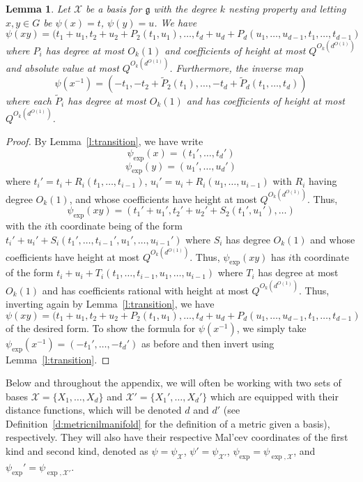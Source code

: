 \documentclass[11pt, a4paper]{amsart}
\theoremstyle{plain}
\theoremstyle{plain}
\newtheorem{lemma}{Lemma}
\theoremstyle{definition}
\theoremstyle{remark}
\numberwithin{equation}{section}
\numberwithin{lemma}{section}
\numberwithin{proposition}{section}
\numberwithin{corollary}{section}
\numberwithin{definition}{section}
\numberwithin{claim}{section}
\begin{document}
\begin{lemma}\label{l:multiplication}
Let $\mathcal{X}$ be a basis for $\mathfrak{g}$ with the degree $k$ nesting property and letting $x, y \in G$ be $\psi(x) = t$, $\psi(y) = u$. We have
$$\psi(xy) = (t_1 + u_1, t_2 + u_2 + P_2(t_1, u_1), \dots, t_d + u_d + P_d(u_1, \dots, u_{d - 1}, t_1, \dots, t_{d - 1})$$
where $P_i$ has degree at most $O_k(1)$ and coefficients of height at most $Q^{O_k(d^{O(1)})}$ and absolute value at most $Q^{O_k(d^{O(1)})}$. Furthermore, the inverse map
$$\psi(x^{-1}) = (-t_1, -t_2 + \tilde{P}_2(t_1), \dots, -t_d + \tilde{P}_d(t_1, \dots, t_d))$$
where each $\tilde{P}_i$ has degree at most $O_k(1)$ and has coefficients of height at most $Q^{O_k(d^{O(1)})}$.
\end{lemma}
\begin{proof}
By Lemma~\ref{l:transition}, we have write
$$\psi_{\exp}(x) = (t_1', \dots, t_d')$$
$$\psi_{\exp}(y) = (u_1', \dots, u_d')$$
where $t_i' = t_i + R_{i}(t_1, \dots, t_{i - 1})$, $u_i' = u_i + R_i(u_1, \dots, u_{i - 1})$ with $R_i$ having degree $O_k(1)$, and whose coefficients have height at most $Q^{O_k(d^{O(1)})}$. Thus,
$$\psi_{\exp}(xy) = (t_1' + u_1', t_2' + u_2' + S_2(t_1', u_1'), \dots)$$
with the $i$th coordinate being of the form $t_i' + u_i' + S_i(t_1', \dots, t_{i - 1}', u_1', \dots, u_{i - 1}')$ where $S_i$ has degree $O_k(1)$ and whose coefficients have height at most $Q^{O_k(d^{O(1)})}$. Thus, $\psi_{\exp}(xy)$ has $i$th coordinate of the form $t_i + u_i + T_i(t_1, \dots, t_{i - 1}, u_1, \dots, u_{i - 1})$ where $T_i$ has degree at most $O_k(1)$ and has coefficients rational with height at most $Q^{O_k(d^{O(1)})}$. Thus, inverting again by Lemma~\ref{l:transition}, we have 
$$\psi(xy) = (t_1 + u_1, t_2 + u_2 + P_2(t_1, u_1), \dots, t_d + u_d + P_d(u_1, \dots, u_{d - 1}, t_1, \dots, t_{d - 1})$$
of the desired form. To show the formula for $\psi(x^{-1})$, we simply take $\psi_{\exp}(x^{-1}) = (-t_1', \dots, -t_d')$ as before and then invert using Lemma~\ref{l:transition}.
\end{proof}
Below and throughout the appendix, we will often be working with two sets of bases $\mathcal{X} = \{X_1, \dots, X_d\}$ and $\mathcal{X}' = \{X_1', \dots, X_d'\}$ which are equipped with their distance functions, which will be denoted $d$ and $d'$ (see Definition~\ref{d:metricnilmanifold} for the definition of a metric given a basis), respectively. They will also have their respective Mal'cev coordinates of the first kind and second kind, denoted as $\psi = \psi_{\mathcal{X}}$, $\psi' = \psi_{\mathcal{X}'}$, $\psi_{\exp} = \psi_{\exp, \mathcal{X}}$, and $\psi_{\exp}' = \psi_{\exp, \mathcal{X}'}$. \\\\
\end{document}
